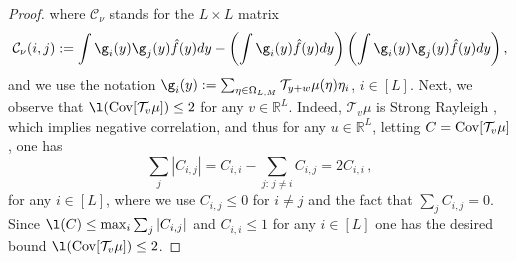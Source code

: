 \documentclass[11pt,reqno]{amsart}
\numberwithin{equation}{section}
\numberwithin{figure}{section}
\renewcommand{\leq}{\le}%
\newcommand{\cov}{{\rm Cov}}
\newcommand{\1}{\mathds{1}}
\let\O=\Omega
\newcommand{\cC}{\ensuremath{\mathcal C}}
\newcommand{\bbR}{{\ensuremath{\mathbb R}} }
\begin{document}
\begin{proof}
	where %
	$\cC_\nu$ stands for the $L\times L$ matrix
	\[
	\cC_\nu(i,j):= \int  \g_i(y)\g_j(y) \hat f(y) dy - \left(\int \g_i(y) \hat f(y) dy\right)\left(\int \g_i(y)\g_j(y) \hat f(y) dy\right),
	\]
	and we use the notation $\g_i(y):=\sum_{\eta\in\O_{L,M}}\mathcal{T}_{y + w}\mu(\eta)\eta_i$, $i\in[L]$. 
Next, we observe that $\l(\cov [\mathcal{T}_{v}\mu])\le 2$ for any $v\in\bbR^L$. Indeed, $\mathcal{T}_v\mu$ is Strong Rayleigh \cite{borcea2009negative}, which implies negative correlation, and thus for any $u\in\bbR^L$, letting $C=\cov [\mathcal{T}_{v}\mu]$, one
has
\[
\sum_j |C_{i,j}| = C_{i,i} - \sum_{j:\,j\neq i} C_{i,j} = 2C_{i,i}\,,
\]
for any $i\in[L]$, where we use $C_{i,j}\le 0$ for $i\neq j$ and the fact that $\sum_{j} C_{i,j}=0$. Since $\l(C)\leq \max_i\sum_j |C_{i,j}|$ and $C_{i,i}\le 1$ for any $i\in[L]$ one has the desired bound $\l(\cov [\mathcal{T}_{v}\mu])\le 2$.


\end{proof}
\end{document}
